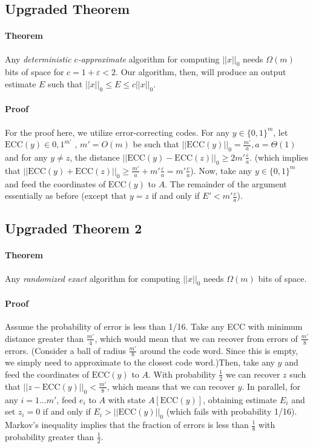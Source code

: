 \documentclass[11pt]{article}
\begin{document}
\subsection{Upgraded Theorem} 
\paragraph{Theorem} Any \textit{deterministic $c$-approximate} algorithm for computing $||x||_0$ needs $\Omega(m)$ bits of space for $c = 1+\varepsilon < 2$. Our algorithm, then, will produce an output estimate $E$ such that $||x||_0 \le E \le c ||x||_0$.
\paragraph{Proof}
For the proof here, we utilize error-correcting codes. 
For any $y \in \{0,1\}^m$, let $\text{ECC}(y) \in {0,1}^{m'}$ , $m'=O(m)$ be such that $||\text{ECC}(y)||_0=\frac{m'}{a}, a=\Theta(1)$ and for any $y \ne z$, the distance $||\text{ECC}(y)-\text{ECC}(z)||_0 \ge 2m' \frac{\varepsilon}{a}.$ (which implies that $||\text{ECC}(y)+\text{ECC}(z)||_0 \ge \frac{m'}{a} + m' \frac{\varepsilon}{a} = m' \frac{c}{a}$). Now, take any $y \in \{0,1\}^m$ and feed the coordinates of $\text{ECC}(y)$ to $A$. The remainder of the argument essentially as before (except that $y=z$ if and only if $E' <m' \frac{c}{a}$).


\subsection{Upgraded Theorem 2}
\paragraph{Theorem} Any \textit{randomized exact} algorithm for computing $||x||_0$ needs $\Omega(m)$ bits of space.
\paragraph{Proof}
Assume the probability of error is less than 1/16. Take any ECC with minimum distance greater than $\frac{m'}{4}$, which would mean that we can recover from errors of $\frac{m'}{8}$ errors. (Consider a ball of radius $\frac{m'}{8}$ around the code word. Since this is empty, we simply need to approximate to the closest code word.)Then, take any $y$ and feed the coordinates of $\text{ECC}(y)$ to $A$. With probability $\frac{1}{2}$ we can recover $z$ such that $||z-\text{ECC}(y)||_0 < \frac{m'}{8}$, which means that we can recover $y$. In parallel, for any $i=1...m'$, feed $e_i$ to $A$  with state $A[\text{ECC}(y)]$, obtaining estimate $E_i$ and set $z_i=0$ if and only if $E_i > ||\text{ECC}(y)||_0$ (which fails with probability 1/16). Markov's inequality implies that the fraction of errors is less than $\frac{1}{8}$ with probability greater than $\frac{1}{2}$.
\end{document}
